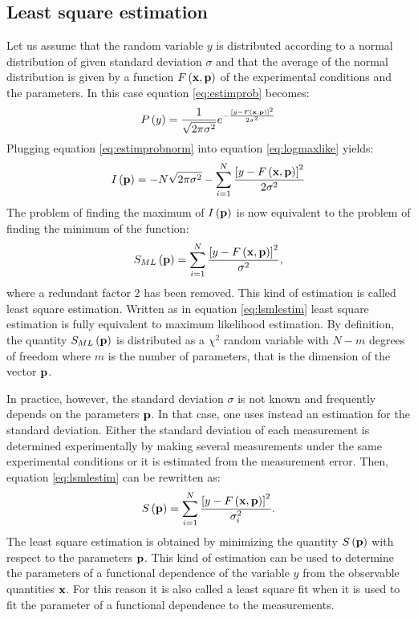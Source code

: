 \subsection{Least square estimation}
Let us assume that the random variable $y$ is distributed
according to a normal distribution of given standard deviation
$\sigma$ and that the average of the normal distribution is given
by a function $F\left({\textbf x},{\textbf p}\right)$ of the experimental
conditions and the parameters. In this case equation
\ref{eq:estimprob} becomes:
\begin{equation}
\label{eq:estimprobnorm}
  P\left(y\right)={1\over\sqrt{2\pi\sigma^2}}e^{-{
  \left[y-F\left({\textbf x},{\textbf p}\right)\right]^2\over 2\sigma^2}}
\end{equation}
Plugging equation \ref{eq:estimprobnorm} into equation
\ref{eq:logmaxlike} yields:
\begin{equation}
  I\left({\textbf p}\right)=-N\sqrt{2\pi\sigma^2}-
  \sum_{i=1}^N {
  \left[y-F\left({\textbf x},{\textbf p}\right)\right]^2\over 2\sigma^2}
\end{equation}
The problem of finding the maximum of $I\left({\textbf p}\right)$ is
now equivalent to the problem of finding the minimum of the
function:
\begin{equation}
\label{eq:lsmlestim}
  S_{\mathop{ML}}\left({\textbf p}\right)=\sum_{i=1}^N {
  \left[y-F\left({\textbf x},{\textbf p}\right)\right]^2\over \sigma^2},
\end{equation}
where a redundant factor 2 has been removed. This kind of
estimation is called least square estimation. Written as in
equation \ref{eq:lsmlestim} least square estimation is fully
equivalent to maximum likelihood estimation. By definition, the
quantity $S_{\mathop{ML}}\left({\textbf p}\right)$ is distributed as a
$\chi^2$ random variable with $N-m$ degrees of freedom where $m$
is the number of parameters, that is the dimension of the vector
${\textbf p}$.

In practice, however, the standard deviation $\sigma$ is not known
and frequently depends on the parameters ${\textbf p}$. In that case,
one uses instead an estimation for the standard deviation. Either
the standard deviation of each measurement is determined
experimentally by making several measurements under the same
experimental conditions or it is estimated from the measurement
error. Then, equation \ref{eq:lsmlestim} can be rewritten as:
\begin{equation}
\label{eq:lsestim}
  S\left({\textbf p}\right)=\sum_{i=1}^N {
  \left[y-F\left({\textbf x},{\textbf p}\right)\right]^2\over \sigma_i^2}.
\end{equation}
The least square estimation is obtained by minimizing the quantity
$S\left({\textbf p}\right)$ with respect to the parameters ${\textbf p}$.
This kind of estimation can be used to determine the parameters of
a functional dependence of the variable $y$ from the observable
quantities ${\textbf x}$. For this reason it is also called a least
square fit when it is used to fit the parameter of a functional
dependence to the measurements.

